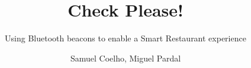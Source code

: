 \documentclass{./llncs2e/llncs}
\begin{document}
\title{Check Please!}

\subtitle{Using Bluetooth beacons to enable a Smart Restaurant experience}
\author{Samuel Coelho, Miguel Pardal}


\maketitle











\appendix





\end{document}
